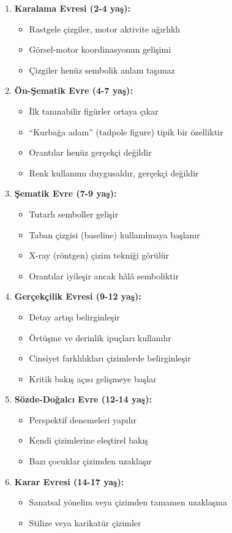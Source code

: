 \begin{enumerate}
  \item \textbf{Karalama Evresi (2-4 yaş):}
  \begin{itemize}
    \item Rastgele çizgiler, motor aktivite ağırlıklı
    \item Görsel-motor koordinasyonun gelişimi
    \item Çizgiler henüz sembolik anlam taşımaz
  \end{itemize}

  \item \textbf{Ön-Şematik Evre (4-7 yaş):}
  \begin{itemize}
    \item İlk tanınabilir figürler ortaya çıkar
    \item ``Kurbağa adam'' (tadpole figure) tipik bir özelliktir
    \item Orantılar henüz gerçekçi değildir
    \item Renk kullanımı duygusaldır, gerçekçi değildir
  \end{itemize}

  \item \textbf{Şematik Evre (7-9 yaş):}
  \begin{itemize}
    \item Tutarlı semboller gelişir
    \item Taban çizgisi (baseline) kullanılmaya başlanır
    \item X-ray (röntgen) çizim tekniği görülür
    \item Orantılar iyileşir ancak hâlâ semboliktir
  \end{itemize}

  \item \textbf{Gerçekçilik Evresi (9-12 yaş):}
  \begin{itemize}
    \item Detay artışı belirginleşir
    \item Örtüşme ve derinlik ipuçları kullanılır
    \item Cinsiyet farklılıkları çizimlerde belirginleşir
    \item Kritik bakış açısı gelişmeye başlar
  \end{itemize}

  \item \textbf{Sözde-Doğalcı Evre (12-14 yaş):}
  \begin{itemize}
    \item Perspektif denemeleri yapılır
    \item Kendi çizimlerine eleştirel bakış
    \item Bazı çocuklar çizimden uzaklaşır
  \end{itemize}

  \item \textbf{Karar Evresi (14-17 yaş):}
  \begin{itemize}
    \item Sanatsal yönelim veya çizimden tamamen uzaklaşma
    \item Stilize veya karikatür çizimler
  \end{itemize}
\end{enumerate}

